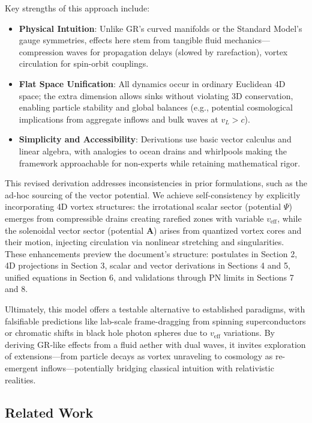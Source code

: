 \documentclass{article}
\begin{document}
Key strengths of this approach include:
\begin{itemize}
    \item \textbf{Physical Intuition}: Unlike GR's curved manifolds or the Standard Model's gauge symmetries, effects here stem from tangible fluid mechanics---compression waves for propagation delays (slowed by rarefaction), vortex circulation for spin-orbit couplings.
    \item \textbf{Flat Space Unification}: All dynamics occur in ordinary Euclidean 4D space; the extra dimension allows sinks without violating 3D conservation, enabling particle stability and global balances (e.g., potential cosmological implications from aggregate inflows and bulk waves at $v_L > c$).
    \item \textbf{Simplicity and Accessibility}: Derivations use basic vector calculus and linear algebra, with analogies to ocean drains and whirlpools making the framework approachable for non-experts while retaining mathematical rigor.
\end{itemize}

This revised derivation addresses inconsistencies in prior formulations, such as the ad-hoc sourcing of the vector potential. We achieve self-consistency by explicitly incorporating 4D vortex structures: the irrotational scalar sector (potential $\Psi$) emerges from compressible drains creating rarefied zones with variable $v_{\text{eff}}$, while the solenoidal vector sector (potential $\mathbf{A}$) arises from quantized vortex cores and their motion, injecting circulation via nonlinear stretching and singularities. These enhancements preview the document's structure: postulates in Section 2, 4D projections in Section 3, scalar and vector derivations in Sections 4 and 5, unified equations in Section 6, and validations through PN limits in Sections 7 and 8.

Ultimately, this model offers a testable alternative to established paradigms, with falsifiable predictions like lab-scale frame-dragging from spinning superconductors or chromatic shifts in black hole photon spheres due to $v_{\text{eff}}$ variations. By deriving GR-like effects from a fluid aether with dual waves, it invites exploration of extensions---from particle decays as vortex unraveling to cosmology as re-emergent inflows---potentially bridging classical intuition with relativistic realities.

\subsection{Related Work}
\end{document}
